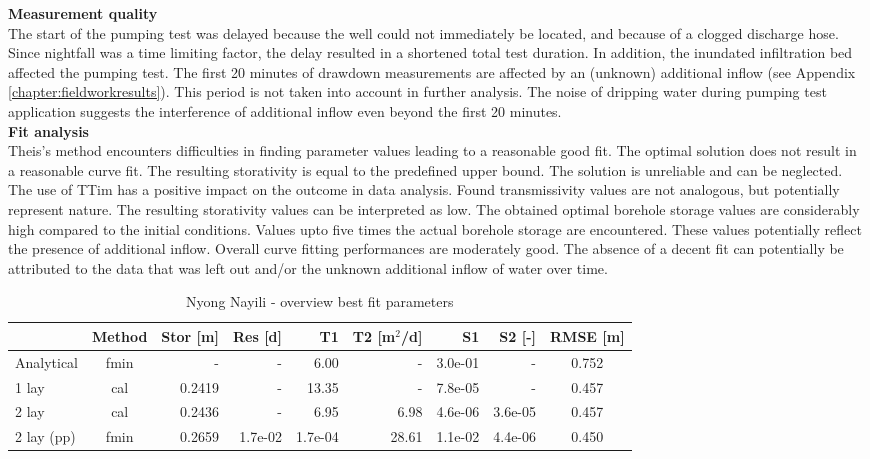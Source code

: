 \textbf{Measurement quality} \\
The start of the pumping test was delayed because the well could not immediately be located, and because of a clogged discharge hose. Since nightfall was a time limiting factor, the delay resulted in a shortened total test duration. In addition, the inundated infiltration bed affected the pumping test. The first 20 minutes of drawdown measurements are affected by an (unknown) additional inflow (see Appendix \ref{chapter:fieldworkresults}). This period is not taken into account in further analysis. The noise of dripping water during pumping test application suggests the interference of additional inflow even beyond the first 20 minutes.  \\
 
\textbf{Fit analysis} \\
Theis's method encounters difficulties in finding  parameter values leading to a reasonable good fit. The optimal solution does not result in a reasonable curve fit. The resulting storativity is equal to the predefined upper bound. The solution is unreliable and can be neglected. The use of TTim has a positive impact on the outcome in data analysis. Found transmissivity values are not analogous, but potentially represent nature. The resulting storativity values can be interpreted as low. The obtained optimal borehole storage values are considerably high compared to the initial conditions. Values upto five times the actual borehole storage are encountered. These values potentially reflect the presence of additional inflow. Overall curve fitting performances are moderately good. The absence of a decent fit can potentially be attributed to the data that was left out and/or the unknown additional inflow of water over time. \\

\begin{table}[h!]
\small
\centering
\caption{Nyong Nayili - overview best fit parameters}
\label{tab:Nyong_Nayili_table}
\begin{tabular}{l|c|r|r|rr|rr|c}
\hline 
\textbf{}       & \textbf{Method} & \textbf{Stor [m]} & \textbf{Res [d]} & \textbf{T1}  & \textbf{T2   [m$^2$/d]}  & \textbf{S1}  & \textbf{S2 [-]}  & \textbf{RMSE [m]} \\ \hline \hline
Analytical                & fmin             & -             & -            & 6.00       & -          & 3.0e-01    & -          & 0.752 \\
1 lay                     & cal              & 0.2419        & -            & 13.35      & -          & 7.8e-05    & -          & 0.457 \\
2 lay                     & cal              & 0.2436        & -            & 6.95       & 6.98       & 4.6e-06    & 3.6e-05    & 0.457 \\
2 lay (pp)                & fmin             & 0.2659        & 1.7e-02      & 1.7e-04    & 28.61      & 1.1e-02    & 4.4e-06    & 0.450 \\ \hline    
\end{tabular}
\end{table}

